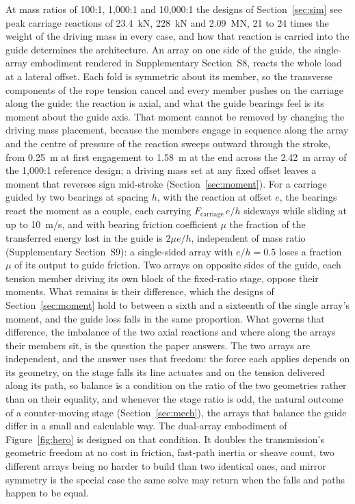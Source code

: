 \documentclass[preprint,12pt,number]{elsarticle}
\begin{document}
At mass ratios of 100:1, 1,000:1 and 10,000:1 the designs of Section~\ref{sec:sim} see peak carriage reactions of 23.4~kN, 228~kN and 2.09~MN, 21 to 24 times the weight of the driving mass in every case, and how that reaction is carried into the guide determines the architecture. An array on one side of the guide, the single-array embodiment rendered in Supplementary Section~S8, reacts the whole load at a lateral offset. Each fold is symmetric about its member, so the transverse components of the rope tension cancel and every member pushes on the carriage along the guide: the reaction is axial, and what the guide bearings feel is its moment about the guide axis. That moment cannot be removed by changing the driving mass placement, because the members engage in sequence along the array and the centre of pressure of the reaction sweeps outward through the stroke, from 0.25~m at first engagement to 1.58~m at the end across the 2.42~m array of the 1,000:1 reference design; a driving mass set at any fixed offset leaves a moment that reverses sign mid-stroke (Section~\ref{sec:moment}). For a carriage guided by two bearings at spacing $h$, with the reaction at offset $e$, the bearings react the moment as a couple, each carrying $F_{\mathrm{carriage}}\,e/h$ sideways while sliding at up to 10~m/s, and with bearing friction coefficient $\mu$ the fraction of the transferred energy lost in the guide is $2\mu e/h$, independent of mass ratio (Supplementary Section~S9): a single-sided array with $e/h = 0.5$ loses a fraction $\mu$ of its output to guide friction. Two arrays on opposite sides of the guide, each tension member driving its own block of the fixed-ratio stage, oppose their moments. What remains is their difference, which the designs of Section~\ref{sec:moment} hold to between a sixth and a sixteenth of the single array's moment, and the guide loss falls in the same proportion. What governs that difference, the imbalance of the two axial reactions and where along the arrays their members sit, is the question the paper answers. The two arrays are independent, and the answer uses that freedom: the force each applies depends on its geometry, on the stage falls its line actuates and on the tension delivered along its path, so balance is a condition on the ratio of the two geometries rather than on their equality, and whenever the stage ratio is odd, the natural outcome of a counter-moving stage (Section~\ref{sec:mech}), the arrays that balance the guide differ in a small and calculable way. The dual-array embodiment of Figure~\ref{fig:hero} is designed on that condition. It doubles the transmission's geometric freedom at no cost in friction, fast-path inertia or sheave count, two different arrays being no harder to build than two identical ones, and mirror symmetry is the special case the same solve may return when the falls and paths happen to be equal.
\end{document}

